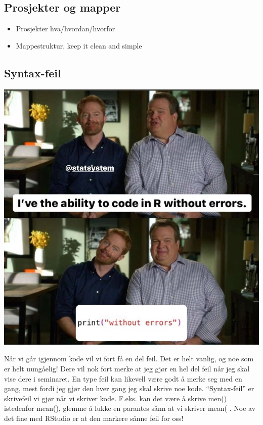\documentclass[
]{article}
\providecommand{\tightlist}{%
  \setlength{\itemsep}{0pt}\setlength{\parskip}{0pt}}
\begin{document}
\hypertarget{prosjekter-og-mapper}{%
\subsection{Prosjekter og mapper}\label{prosjekter-og-mapper}}

\begin{itemize}
\tightlist
\item
  Prosjekter hva/hvordan/hvorfor
\item
  Mappestruktur, keep it clean and simple
\end{itemize}

\hypertarget{syntax-feil}{%
\subsection{Syntax-feil}\label{syntax-feil}}

\includegraphics{Bilder/Error.png}

Når vi går igjennom kode vil vi fort få en del feil. Det er helt vanlig,
og noe som er helt uungåelig! Dere vil nok fort merke at jeg gjør en hel
del feil når jeg skal vise dere i seminaret. En type feil kan likevell
være godt å merke seg med en gang, mest fordi jeg gjør den hver gang jeg
skal skrive noe kode. ``Syntax-feil'' er skrivefeil vi gjør når vi
skriver kode. F.eks. kan det være å skrive men() istedenfor mean(),
glemme å lukke en parantes sånn at vi skriver mean( . Noe av det fine
med RStudio er at den markere sånne feil for oss!
\end{document}
